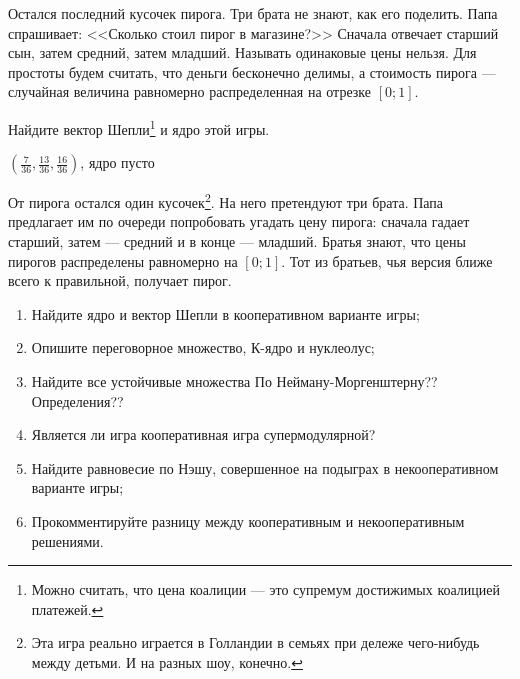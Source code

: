 \begin{problem}[Toetjes.]
\begin{source}
\cite{ferguson:tn}
\end{source}
Остался последний кусочек пирога. Три брата не знают, как его поделить. Папа спрашивает: <<Сколько стоил пирог в магазине?>> Сначала отвечает старший сын, затем средний, затем младший. Называть одинаковые цены нельзя. Для простоты будем считать, что деньги бесконечно делимы, а стоимость пирога --- случайная величина равномерно распределенная на отрезке $[0;1]$.

Найдите вектор Шепли\footnote{Можно считать, что цена коалиции --- это супремум достижимых коалицией платежей.} и ядро этой игры.

\begin{sol}
$\left(\frac{7}{36},\frac{13}{36},\frac{16}{36}\right)$, ядро пусто
\end{sol}
\end{problem}



\begin{problem}


От пирога остался один кусочек\footnote{Эта игра реально играется в Голландии в семьях при дележе чего-нибудь между детьми. И на разных шоу, конечно.}. На него претендуют три брата. Папа предлагает им по очереди попробовать угадать цену пирога: сначала гадает старший, затем --- средний и в конце --- младший. Братья знают, что цены пирогов распределены равномерно на $[0;1]$. Тот из братьев, чья версия ближе всего к правильной, получает пирог.
\begin{enumerate}
\item Найдите ядро и вектор Шепли в кооперативном варианте игры;

\item Опишите переговорное множество, К-ядро и нуклеолус;

\item Найдите все устойчивые множества {\red По Нейману-Моргенштерну?? Определения??}


\item Является ли игра кооперативная игра супермодулярной?

\item Найдите равновесие по Нэшу, совершенное на подыграх в некооперативном варианте игры;

\item Прокомментируйте разницу между кооперативным и некооперативным решениями.
\end{enumerate}



\begin{sol}

\end{sol}
\end{problem}




